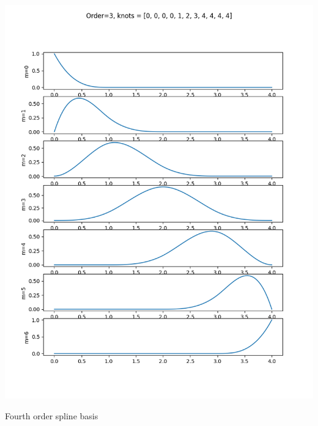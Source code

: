 \begin{marginfigure}[0in]
  \includegraphics[width=\linewidth]{./chap5_trajectory_planning/figures/spline_basis_3}
  \caption{Fourth order spline basis}
  \label{fig:spline_basis_3}  
\end{marginfigure}

